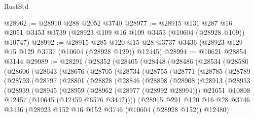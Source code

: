 \begin{lexlean}{RustStd}
\begin{coremodule}
@28962 := @28910 @288 @2052 @3740
@28977 := @28915
    @131
    @287
    @16
    @2051
    @3453
    @3739
    (@28923 @109 @16 @109 @3453 (@10604 (@28928 @109)) @10747)
@28992 := @28915
    @285
    @120
    @15
    @28
    @3737
    @3436
    (@28923 @129 @15 @129 @3737 (@10604 (@28928 @129)) @12445)
@28994 := @10621 @28854 @3144
@29089 := @28291
    (@28352
      (@28405
        (@28448
          (@28486
            (@28534
              (@28580
                (@28606
                  (@28643
                    (@28676
                      (@28705
                        (@28734
                          (@28755
                            (@28771
                              (@28785
                                (@28789
                                  (@28793
                                    (@28797
                                      (@28801
                                        (@28828
                                          (@28846
                                            (@28898
                                              (@28908
                                                (@28913
                                                  (@28933
                                                    (@28939
                                                      (@28945
                                                        (@28959
                                                          (@28962 (@28977 (@28992 @28994)))
                                                          @21651
                                                          @10808
                                                          @12457
                                                          (@10645 (@12459 @6576 @3442))))
                                                      (@28915
                                                        @291
                                                        @120
                                                        @16
                                                        @28
                                                        @3746
                                                        @3436
                                                        (@28923
                                                          @152
                                                          @16
                                                          @152
                                                          @3746
                                                          (@10604 (@28928 @152))
                                                          @12480)

\end{coremodule}
\end{lexlean}
